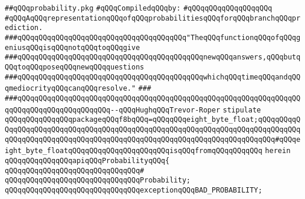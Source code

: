 \label{src/lib/compiler/back/low/library/probability.pkg}
\verb|##qQQqprobability.pkg|\newline
\newline
\verb|#qQQqCompiledqQQqby:|\newline
\verb|#qQQqqQQqqQQqqQQqqQQq|\newline
\newline
\newline
\newline
\verb|#qQQqAqQQqrepresentationqQQqofqQQqprobabilitiesqQQqforqQQqbranchqQQqprediction.|\newline
\newline
\newline
\verb|###qQQqqQQqqQQqqQQqqQQqqQQqqQQqqQQqqQQqqQQq"TheqQQqfunctionqQQqofqQQqgeniusqQQqisqQQqnotqQQqtoqQQqgive|\newline
\verb|###qQQqqQQqqQQqqQQqqQQqqQQqqQQqqQQqqQQqqQQqqQQqnewqQQqanswers,qQQqbutqQQqtoqQQqposeqQQqnewqQQqquestions|\newline
\verb|###qQQqqQQqqQQqqQQqqQQqqQQqqQQqqQQqqQQqqQQqqQQqwhichqQQqtimeqQQqandqQQqmediocrityqQQqcanqQQqresolve."|\newline
\verb|###|\newline
\verb|###qQQqqQQqqQQqqQQqqQQqqQQqqQQqqQQqqQQqqQQqqQQqqQQqqQQqqQQqqQQqqQQqqQQqqQQqqQQqqQQqqQQqqQQqqQQq--qQQqHughqQQqTrevor-Roper|\newline
\newline
\newline
\verb|stipulate|\newline
\verb|qQQqqQQqqQQqqQQqpackageqQQqf8bqQQq=qQQqqQQqeight_byte_float;qQQqqQQqqQQqqQQqqQQqqQQqqQQqqQQqqQQqqQQqqQQqqQQqqQQqqQQqqQQqqQQqqQQqqQQqqQQqqQQqqQQqqQQqqQQqqQQqqQQqqQQqqQQqqQQqqQQqqQQqqQQqqQQqqQQqqQQqqQQqqQQq#qQQqeight_byte_floatqQQqqQQqqQQqqQQqqQQqqQQqisqQQqfromqQQqqQQqqQQq|\newline
\verb|herein|\newline
\newline
\verb|qQQqqQQqqQQqqQQqapiqQQqProbabilityqQQq{|\newline
\verb|qQQqqQQqqQQqqQQqqQQqqQQqqQQqqQQq#|\newline
\verb|qQQqqQQqqQQqqQQqqQQqqQQqqQQqqQQqProbability;|\newline
\newline
\verb|qQQqqQQqqQQqqQQqqQQqqQQqqQQqqQQqexceptionqQQqBAD_PROBABILITY;|\newline

